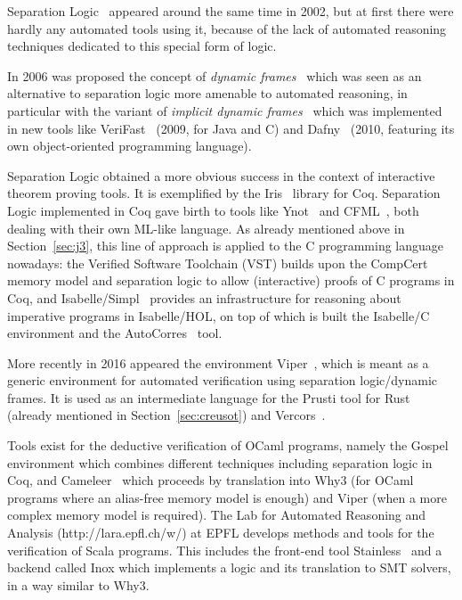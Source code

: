 \documentclass[a4paper,11pt]{article}
\begin{document}
Separation Logic~\cite{reynolds02lics} appeared around the same time in 2002,
but at first there were hardly any automated tools using it, because of the lack
of automated reasoning techniques dedicated to this special form of logic.

In 2006 was proposed the concept of \emph{dynamic frames}~\cite{kassios2006fm}
which was seen as an alternative to separation logic more amenable to automated
reasoning, in particular with the variant of \emph{implicit dynamic
  frames}~\cite{Smans09} which was implemented in new tools like
VeriFast~\cite{jacobs11nfm} (2009, for Java and C) and
Dafny~\cite{Dafny,leino14fide} (2010, featuring its own object-oriented
programming language).

Separation Logic obtained a more obvious success in the context of interactive
theorem proving tools. It is exemplified by the Iris~\cite{iris17} library for
Coq. Separation Logic implemented in Coq gave birth to tools like
Ynot~\cite{nanevski08icfp} and CFML~\cite{chargueraud08icfp}, both dealing with
their own ML-like language. As already mentioned above in Section~\ref{sec:j3},
this line of approach is applied to the C programming language nowadays: the
Verified Software Toolchain (VST) builds upon the CompCert memory model and
separation logic to allow (interactive) proofs of C programs in Coq, and
Isabelle/Simpl~\cite{Schirmer-PhD} provides an infrastructure for reasoning
about imperative programs in Isabelle/HOL, on top of which is built the
Isabelle/C~\cite{tuong19fide} environment and the
AutoCorres~\cite{greenaway14pldi} tool.

More recently in 2016 appeared the environment
Viper~\cite{MuellerSchwerhoffSummers16}, which is meant as a generic environment
for automated verification using separation logic/dynamic frames. It is used as
an intermediate language for the Prusti tool for Rust (already mentioned in
Section~\ref{sec:creusot}) and Vercors~\cite{armborst24cav}.


Tools exist for the deductive verification of OCaml programs, namely the
Gospel~\cite{gospelfm19} environment which combines different techniques
including separation logic in Coq, and Cameleer~\cite{DBLP:conf/cav/PereiraR20}
which proceeds by translation into Why3 (for OCaml programs where an alias-free
memory model is enough) and Viper (when a more complex memory model is
required).  The Lab for Automated Reasoning and Analysis
(http://lara.epfl.ch/w/) at EPFL develops methods and tools for the verification
of Scala programs. This includes the front-end tool
Stainless~\cite{chassot24ijcar} and a backend called Inox which implements a
logic and its translation to SMT solvers, in a way similar to Why3.
\end{document}
